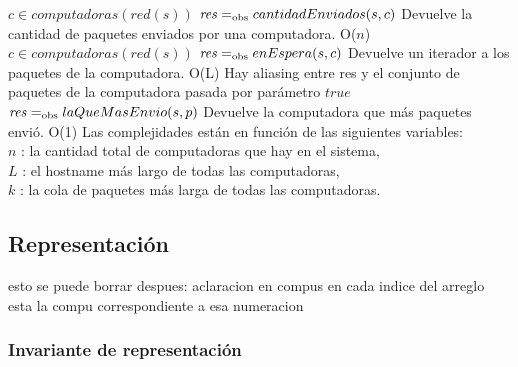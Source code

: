  {$c \in computadoras(red(s))$}
 {$\text{\textit{res}} =_{\mathrm{obs}} cantidadEnviados(s,c)$}
 {Devuelve la cantidad de paquetes enviados por una computadora.}
 {O($n$)} %
 {}
 {$c \in computadoras(red(s))$}
 {$\text{\textit{res}} =_{\mathrm{obs}} enEspera(s,c)$}
 {Devuelve un iterador a los paquetes de la computadora.}
 {O(L)}
 {Hay aliasing entre res y el conjunto de paquetes de la computadora pasada por parámetro }
 {$true$}
 {$\text{\textit{res}} =_{\mathrm{obs}} laQueMasEnvio(s,p)$}
 {Devuelve la computadora que más paquetes envió.}
 {O(1)}
 {}
Las complejidades están en función de las siguientes variables:\\
$n$ : la cantidad total de computadoras que hay en el sistema, \\
$L$ : el hostname más largo de todas las computadoras, \\
$k$ : la cola de paquetes más larga de todas las computadoras. 

\subsection{Representación}


esto se puede borrar despues:
aclaracion en compus en cada indice del arreglo esta la compu correspondiente a esa numeracion

\subsubsection*{Invariante de representación}

